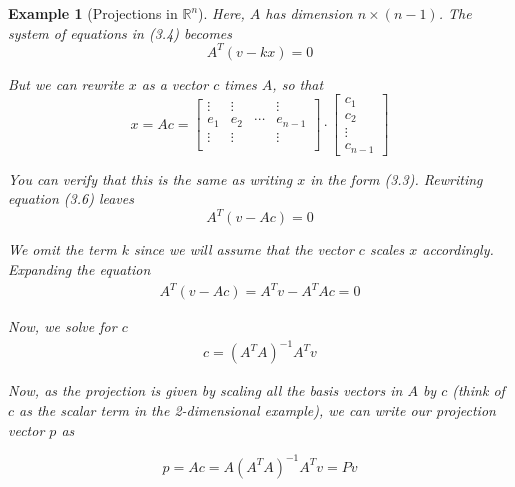 \documentclass{book}
\newtheorem{example}{Example}[section]
\begin{document}
\begin{example}[Projections in $\mathbb{R}^{n}$]
    Here, $A$ has dimension $n\times (n-1)$. The system of equations in (3.4)
    becomes
    \begin{equation}
        A^{T}\left(v-kx\right) = 0
    \end{equation}

    But we can rewrite $x$ as a vector $c$ times $A$, so that
    \begin{equation}
        x = Ac =  \left[\begin{matrix}
                \vdots & \vdots &        & \vdots  \\
                e_1    & e_2    & \cdots & e_{n-1} \\
                \vdots & \vdots &        & \vdots  \\
            \end{matrix}\right]\cdot\left[\begin{matrix}
                c_1 \\c_2\\\vdots\\c_{n-1}
            \end{matrix}\right]
    \end{equation}

    You can verify that this is the same as writing $x$ in the form (3.3).
    Rewriting equation (3.6) leaves
    \begin{equation*}
        A^{T}\left(v-Ac\right) = 0
    \end{equation*}

    We omit the term $k$ since we will assume that the vector $c$ scales $x$
    accordingly. Expanding the equation
    \begin{equation}
        \begin{split}
            A^{T}\left(v-Ac\right) = A^{T}v - A^{T}Ac = 0
        \end{split}
    \end{equation}

    Now, we solve for $c$
    \begin{equation}
        \begin{split}
            c={(A^{T}A)}^{-1}A^{T}v
        \end{split}
    \end{equation}

    Now, as the projection is given by scaling all the basis vectors in $A$ by $c$
    (think of $c$ as the scalar term in the 2-dimensional example), we can write
    our projection vector $p$ as

    \begin{equation}
        p = Ac = A{(A^{T}A)}^{-1}A^{T}v = Pv
    \end{equation}


\end{example}
\end{document}
